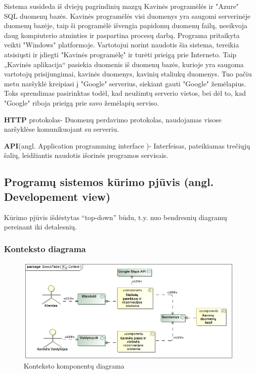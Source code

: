 \documentclass{VUMIFPSkursinis}
\begin{document}
Sistema susideda iš dviejų pagrindinių mazgų Kavinės programėlės ir "Azure" SQL duomenų bazės. Kavinės programėlės visi duomenys yra saugomi serverinėje duomenų bazėje, taip ši programėlė išvengia papidomų duomenų failų, neeikvoja daug kompiuterio atminties ir paspartina procesų darbą. Programa pritaikyta veikti "Windows" platformoje. Vartotojui norint naudotis šia sistema, tereikia atsisiųsti ir įdiegti "Kavinės programėlę" ir turėti prieigą prie Interneto. Taip „Kavinės aplikacija“ pasiekia duomenis iš duomenų bazės, kurioje yra saugoma vartotojų prisijungimai, kavinės duomenys, kavinių staliukų duomenys. Tuo pačiu metu naršyklė kreipiasi į "Google" serverius, siekiant gauti "Google" žemėlapius. Toks sprendimas pasirinktas todėl, kad neužimtų serverio vietos, bei dėl to, kad "Google" riboja prieigą prie savo žemėlapių serviso. 

\textbf{HTTP} protokolas- Duomenų perdavimo protokolas, naudojamas visose naršyklėse komunikuojant su serveriu.

\textbf{API}(angl. Application programming interface )- Interfeisas, pateikiamas trečiųjų šalių, leidžiantis naudotis išorinės programos servisais.


\subsection {Programų sistemos kūrimo pjūvis (angl. Developement view)}
Kūrimo pjūvis išdėstytas “top-down” būdu, t.y. nuo bendresnių
diagramų pereinant iki detalesnių.

\subsubsection{Konteksto diagrama}

\begin {figure}[H]
	\includegraphics[width=\textwidth,height=\textheight,keepaspectratio]{img/Context}
	\caption{Konteksto komponentų diagrama}
	\label{fig:Context}
\end{figure}
\end{document}
